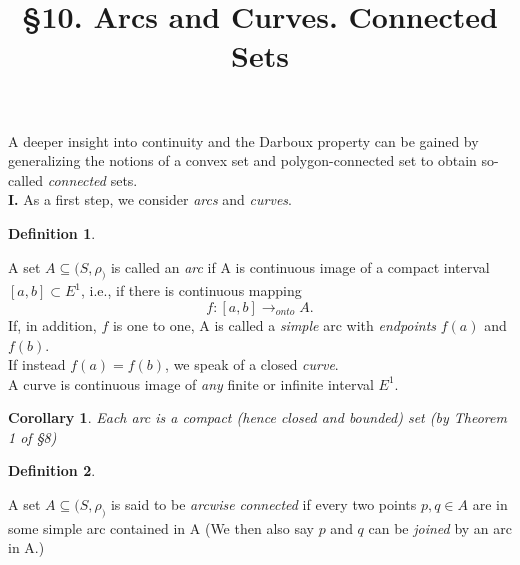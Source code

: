 \documentclass{article}
\title{\textbf{\S 10.  Arcs and Curves. Connected Sets}}
\newtheorem{defi}{Definition}
\newtheorem{cor}{Corollary}
\begin{document}
\maketitle

A deeper insight into continuity and the Darboux property can be gained by
generalizing the notions of a convex set and polygon-connected set to obtain
so-called \textit{connected} sets.\\
\textbf{I.} {As a first step, we consider \textit{arcs} and \textit{curves}.}
\begin{defi}
\end{defi}
    {A set $A \subseteq ( S,\rho_ )$ is called an \textit{arc} if A is continuous image of a compact interval $\left[a, b\right] \subset E^1$, i.e., if there is continuous mapping}  
    $$f: [a, b] \longrightarrow_{onto}  A.$$
    If, in addition, $f$ is one to one, A is called a \textit{simple} arc with \textit{endpoints} $f(a)$ and $f(b)$.\\
    If instead $f(a) = f(b)$, we speak of a closed \textit{curve}.\\
    A curve is continuous image of \textit{any} finite or infinite interval $E^1$.\\ 
\begin{cor}
    {Each arc is a compact (hence closed and bounded) set (by \textit{Theorem 1 of \S8})}
\end{cor}
\begin{defi}
\end{defi}
    {A set $A \subseteq ( S,\rho_ )$  is said to be \textit{arcwise connected} if every two points $p,q \in A$ are in some simple arc contained in A (We then also say $p$ and $q$ can be \textit{joined} by an arc in A.)}\\
\end{document}
